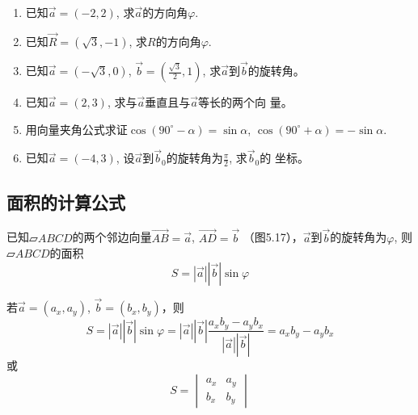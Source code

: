 \begin{ex}
\begin{enumerate}
    \item 已知$\vec{a}=(-2,2)$, 求$\vec{a}$的方向角$\varphi$.
    \item 已知$\vec{R}=(\sqrt{3},-1)$, 求$R$的方向角$\varphi$.
    
    \item 已知$\vec{a}=(-\sqrt{3},0)$, $\vec{b}=\left(\frac{\sqrt{3}}{2},1\right)$, 
    求$\vec{a}$到$\vec{b}$的旋转角。
    \item 已知$\vec{a}=(2,3)$, 求与$\vec{a}$垂直且与$\vec{a}$等长的两个向
    量。
    \item 用向量夹角公式求证$\cos(90^{\circ}-\alpha)=\sin\alpha$, $\cos(90^{\circ}+\alpha)=-\sin\alpha$.
    \item 已知$\vec{a}=(-4,3)$, 设$\vec{a}$到$\vec{b}_0$的旋转角为$\frac{\pi}{2}$,  求$\vec{b}_0$的
    坐标。
\end{enumerate}
\end{ex}

\subsection{面积的计算公式}
已知$\parallelogram{ABCD}$的两个邻边向量$\Vec{AB}=\vec{a}$, $\Vec{AD}=\vec{b}$
（图5.17），$\vec{a}$到$\vec{b}$的旋转角为$\varphi$, 则$\parallelogram{ABCD}$的面积
\[S=|\vec{a}|\left|\vec{b}\right|\sin\varphi\]

\begin{figure}[htp]
    \centering
{}
    \caption{}
\end{figure}


若$\vec{a}=(a_x,a_y)$, $\vec{b}=(b_x,b_y)$，则
\[S=|\vec{a}|\left|\vec{b}\right|\sin\varphi=|\vec{a}|\left|\vec{b}\right|\frac{a_xb_y-a_yb_x}{|\vec{a}|\left|\vec{b}\right|}=a_xb_y-a_yb_x\]
或
\begin{equation}
    S=\begin{vmatrix}
        a_x&a_y\\b_x&b_y
    \end{vmatrix}
\end{equation}

